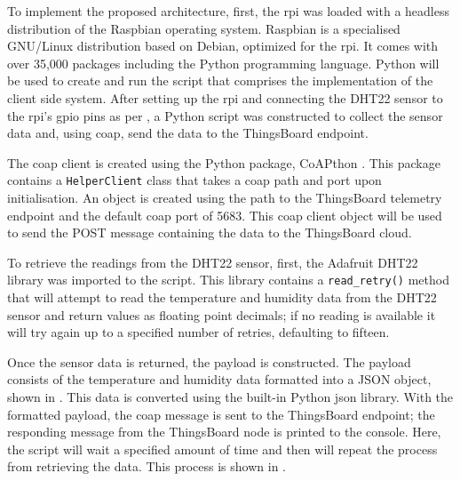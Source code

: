 To implement the proposed architecture, first, the \gls{rpi} was loaded with a 
headless distribution of the Raspbian \citep{raspbian_raspbian_2018} operating system. 
Raspbian is a specialised GNU/Linux distribution based on Debian, optimized for 
the \gls{rpi}. 
It comes with over 35,000 packages including the Python programming language. 
Python will be used to create and run the script that comprises the implementation
of the client side system.
After setting up the \gls{rpi} and connecting the DHT22 sensor to the \gls{rpi}'s
\gls{gpio} pins as per , a Python script was constructed
to collect the sensor data and, using \gls{coap}, send the data to the ThingsBoard
\citep{thingsboard_inc._thingsboard_2018} endpoint. 

The \gls{coap} client is created using the Python package, CoAPthon
\citep{tanganelli_coapthon3_2018}. 
This package contains a \texttt{HelperClient} class that takes a \gls{coap} 
path and port upon initialisation. 
An object is created using the path to the 
ThingsBoard telemetry endpoint and the default \gls{coap} port of 5683.
This \gls{coap} client object will be used to send the POST message containing
the data to the ThingsBoard cloud.

To retrieve the readings from the DHT22 sensor,
first, the Adafruit DHT22 library \citep{adafruit_adafruit_python_dht_2018} 
was imported to the script. This library contains a \texttt{read\_retry()} 
method that will attempt to read the temperature and humidity data from the 
DHT22 sensor and return values as floating point decimals; 
if no reading is available it will try again up to a specified number of retries,
defaulting to fifteen.


Once the sensor data is returned, the payload is constructed. The payload 
consists of the temperature and humidity data formatted into a JSON object, 
shown in . This data is converted using the built-in
Python \gls{json} library. 
With the formatted payload, the \gls{coap} message is sent to the ThingsBoard
endpoint; the responding message from the ThingsBoard node is printed to the console.
Here, the script will wait a specified amount of time and then will repeat the 
process from retrieving the data. This process is shown in 
. 

